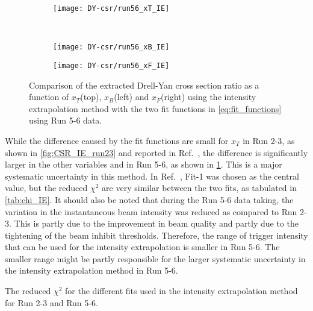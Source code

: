 \documentclass[../main.tex]{subfiles}
\begin{document}
\begin{figure}[h!]
	\centering
	\begin{subfigure}{0.6\linewidth}
		\texttt{[image: DY-csr/run56\_xT\_IE]}
	\end{subfigure}\\
	\begin{subfigure}{0.45\linewidth}
		\texttt{[image: DY-csr/run56\_xB\_IE]}
	\end{subfigure}
	\begin{subfigure}{0.45\linewidth}
		\texttt{[image: DY-csr/run56\_xF\_IE]}
	\end{subfigure}
	\caption{Comparison of the extracted Drell-Yan cross section ratio as a function of $x_T$(top),
		$x_B$(left) and $x_F$(right) using the intensity extrapolation method with the two fit functions in \cref{eq:fit_functions}
		using Run 5-6 data.}
	\label{fig:CSR_IE_run56}
\end{figure}

While the difference caused by the fit functions are small for $x_T$ in Run 2-3,
as shown in \cref{fig:CSR_IE_run23} and reported in Ref.~\cite{dove2021},
the difference is significantly larger in the other variables and in Run 5-6, as shown in \cref{fig:CSR_IE_run56}.
This is a major systematic uncertainty in this method. 
In Ref.~\cite{dove2021}, Fit-1 was chosen as the central value, but the reduced $\chi^2$ are very similar between the two fits,
as tabulated in \cref{tab:chi_IE}. 
It should also be noted that during the Run 5-6 data taking, the variation in the instantaneous beam
intensity was reduced as compared to Run 2-3.
This is partly due to the improvement in beam quality and partly due to the tightening of the beam inhibit thresholds.
Therefore, the range of trigger intensity that can be used for the intensity extrapolation is smaller in Run 5-6. 
The smaller range might be partly responsible for the larger systematic uncertainty in the intensity extrapolation method
in Run 5-6.
\begin{table}[h!]
	\centering
	\caption{The reduced $\chi^2$ for the different fits used in the intensity extrapolation method for Run 2-3 and Run 5-6. }
	\label{tab:chi_IE}
	
\end{table}
\end{document}
